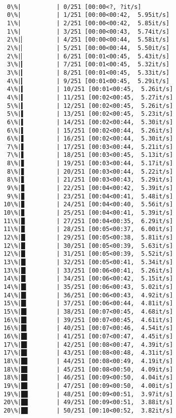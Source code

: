 \documentclass[11pt]{article}
\begin{document}
    \begin{Verbatim}[commandchars=\\\{\}]

  0\%|          | 0/251 [00:00<?, ?it/s]
  0\%|          | 1/251 [00:00<00:42,  5.95it/s]
  1\%|          | 2/251 [00:00<00:42,  5.85it/s]
  1\%|          | 3/251 [00:00<00:43,  5.74it/s]
  2\%|▏         | 4/251 [00:00<00:44,  5.58it/s]
  2\%|▏         | 5/251 [00:00<00:44,  5.50it/s]
  2\%|▏         | 6/251 [00:01<00:45,  5.43it/s]
  3\%|▎         | 7/251 [00:01<00:45,  5.32it/s]
  3\%|▎         | 8/251 [00:01<00:45,  5.33it/s]
  4\%|▎         | 9/251 [00:01<00:45,  5.29it/s]
  4\%|▍         | 10/251 [00:01<00:45,  5.26it/s]
  4\%|▍         | 11/251 [00:02<00:45,  5.27it/s]
  5\%|▍         | 12/251 [00:02<00:45,  5.26it/s]
  5\%|▌         | 13/251 [00:02<00:45,  5.23it/s]
  6\%|▌         | 14/251 [00:02<00:44,  5.30it/s]
  6\%|▌         | 15/251 [00:02<00:44,  5.26it/s]
  6\%|▋         | 16/251 [00:02<00:44,  5.30it/s]
  7\%|▋         | 17/251 [00:03<00:44,  5.21it/s]
  7\%|▋         | 18/251 [00:03<00:45,  5.13it/s]
  8\%|▊         | 19/251 [00:03<00:44,  5.17it/s]
  8\%|▊         | 20/251 [00:03<00:44,  5.22it/s]
  8\%|▊         | 21/251 [00:03<00:43,  5.29it/s]
  9\%|▉         | 22/251 [00:04<00:42,  5.39it/s]
  9\%|▉         | 23/251 [00:04<00:41,  5.48it/s]
 10\%|▉         | 24/251 [00:04<00:40,  5.56it/s]
 10\%|▉         | 25/251 [00:04<00:41,  5.39it/s]
 11\%|█         | 27/251 [00:04<00:35,  6.29it/s]
 11\%|█         | 28/251 [00:05<00:37,  6.00it/s]
 12\%|█▏        | 29/251 [00:05<00:38,  5.81it/s]
 12\%|█▏        | 30/251 [00:05<00:39,  5.63it/s]
 12\%|█▏        | 31/251 [00:05<00:39,  5.52it/s]
 13\%|█▎        | 32/251 [00:05<00:41,  5.34it/s]
 13\%|█▎        | 33/251 [00:06<00:41,  5.26it/s]
 14\%|█▎        | 34/251 [00:06<00:42,  5.15it/s]
 14\%|█▍        | 35/251 [00:06<00:43,  5.02it/s]
 14\%|█▍        | 36/251 [00:06<00:43,  4.92it/s]
 15\%|█▍        | 37/251 [00:06<00:44,  4.81it/s]
 15\%|█▌        | 38/251 [00:07<00:45,  4.68it/s]
 16\%|█▌        | 39/251 [00:07<00:45,  4.61it/s]
 16\%|█▌        | 40/251 [00:07<00:46,  4.54it/s]
 16\%|█▋        | 41/251 [00:07<00:47,  4.45it/s]
 17\%|█▋        | 42/251 [00:08<00:47,  4.39it/s]
 17\%|█▋        | 43/251 [00:08<00:48,  4.31it/s]
 18\%|█▊        | 44/251 [00:08<00:49,  4.19it/s]
 18\%|█▊        | 45/251 [00:08<00:50,  4.09it/s]
 18\%|█▊        | 46/251 [00:09<00:50,  4.04it/s]
 19\%|█▊        | 47/251 [00:09<00:50,  4.00it/s]
 19\%|█▉        | 48/251 [00:09<00:51,  3.97it/s]
 20\%|█▉        | 49/251 [00:09<00:51,  3.88it/s]
 20\%|█▉        | 50/251 [00:10<00:52,  3.82it/s]

\end{Verbatim}
\end{document}

